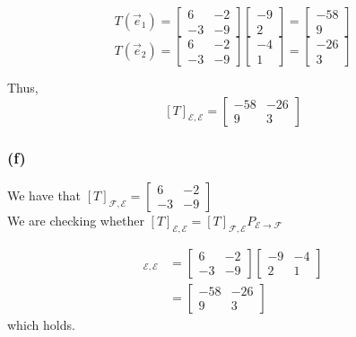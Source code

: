 \documentclass{article}
\begin{document}
\[
T(\vec{e}_1) = \begin{bmatrix}
    6 & -2 \\
    -3 & -9
\end{bmatrix} \begin{bmatrix}
    -9 \\2
\end{bmatrix} = \begin{bmatrix}
    -58 \\ 9
\end{bmatrix}
\]
\[
T(\vec{e}_2) = \begin{bmatrix}
    6 & -2 \\
    -3 & -9
\end{bmatrix} \begin{bmatrix}
    -4 \\ 1
\end{bmatrix} = \begin{bmatrix}
    -26 \\ 3
\end{bmatrix} 
\]

Thus,
\[
[T]_{\mathcal{E},\mathcal{E}} = \begin{bmatrix}
        -58 & -26 \\
        9 & 3
    \end{bmatrix}
\]



\subsubsection*{(f)}

We have that 
\(
[T]_{\mathcal{F}, \mathcal{E}} = \begin{bmatrix}
    6 & -2 \\
    -3 & -9
\end{bmatrix}
\)
\\

We are checking whether \([T]_{\mathcal{E},\mathcal{E}} = 
[T]_{\mathcal{F},\mathcal{E}}P_{\mathcal{E} \rightarrow \mathcal{F}}\)

\begin{align*}
    [T]_{\mathcal{E},\mathcal{E}} &= \begin{bmatrix}
        6 & -2 \\
        -3 & -9
    \end{bmatrix} \begin{bmatrix}
            -9 & -4 \\
            2 & 1
        \end{bmatrix} \\
    &= \begin{bmatrix}
        -58 & -26 \\
        9 & 3
    \end{bmatrix}
\end{align*}
which holds.
\end{document}
